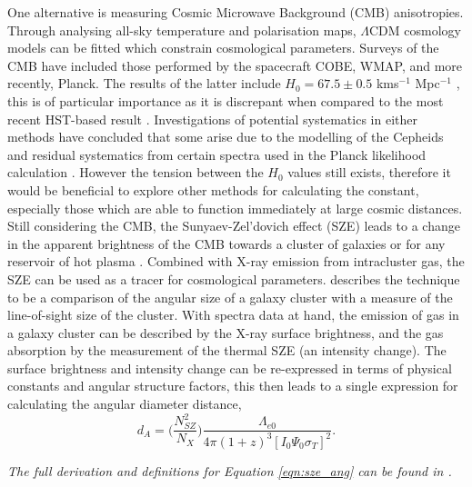 \documentclass[12pt, onecolumn]{revtex4}    %
\begin{document}
One alternative is measuring Cosmic Microwave Background (CMB) anisotropies. Through analysing all-sky temperature and polarisation maps, $\Lambda$CDM cosmology models can be fitted which constrain cosmological parameters. Surveys of the CMB have included those performed by the spacecraft COBE, WMAP, and more recently, Planck. The results of the latter include $H_0=67.5\pm0.5$ kms$^{-1}$ Mpc$^{-1}$ \citep{2018arXiv180706209P}, this is of particular importance as it is discrepant when compared to the most recent HST-based result \citep{2018ApJ...855..136R}. Investigations of potential systematics in either methods have concluded that some arise due to the modelling of the Cepheids \citep{2018MNRAS.477.4534F} and residual systematics from certain spectra used in the Planck likelihood calculation \citep{2015PhRvD..91b3518S}. However the tension between the $H_0$ values still exists, therefore it would be beneficial to explore other methods for calculating the constant, especially those which are able to function immediately at large cosmic distances. \\

Still considering the CMB, the Sunyaev-Zel'dovich effect (SZE) leads to a change in the apparent brightness of the CMB towards a cluster of galaxies or for any reservoir of hot plasma \citep{1999PhR...310...97B, 2002ARA&A..40..643C}. Combined with X-ray emission from intracluster gas, the SZE can be used as a tracer for cosmological parameters. \cite{1999PhR...310...97B} describes the technique to be a comparison of the angular size of a galaxy cluster with a measure of the line-of-sight size of the cluster. With spectra data at hand, the emission of gas in a galaxy cluster can be described by the X-ray surface brightness, and the gas absorption by the measurement of the thermal SZE (an intensity change).  The surface brightness and intensity change can be re-expressed in terms of physical constants and angular structure factors, this then leads to a single expression for calculating the angular diameter distance, 
\begin{equation}
d_A = \Bigg( \frac{N^2_{SZ}}{N_X} \Bigg)\frac{\Lambda_{e0}}{4\pi (1+z)^3 [I_0 \Psi_0 \sigma_T]^2}.
\label{eqn:sze_ang}
\end{equation}

\textit{The full derivation and definitions for Equation \ref{eqn:sze_ang} can be found in \cite{1997ApJ...480..449H}.} \\
\end{document}
